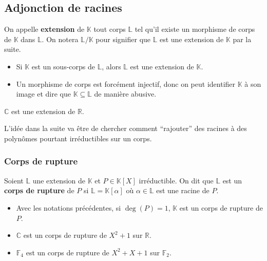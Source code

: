   \subsection{Adjonction de racines}
  \label{144-1}


  \begin{definition}
    On appelle \textbf{extension} de $\mathbb{K}$ tout corps $\mathbb{L}$ tel qu'il existe un morphisme de corps de $\mathbb{K}$ dans $\mathbb{L}$. On notera $\mathbb{L} / \mathbb{K}$ pour signifier que $\mathbb{L}$ est une extension de $\mathbb{K}$ par la suite.
  \end{definition}

  \begin{remark}
    \begin{itemize}
      \item Si $\mathbb{K}$ est un sous-corps de $\mathbb{L}$, alors $\mathbb{L}$ est une extension de $\mathbb{K}$.
      \item Un morphisme de corps est forcément injectif, donc on peut identifier $\mathbb{K}$ à son image et dire que $\mathbb{K} \subseteq \mathbb{L}$ de manière abusive.
    \end{itemize}
  \end{remark}

  \begin{example}
    $\mathbb{C}$ est une extension de $\mathbb{R}$.
  \end{example}

  L'idée dans la suite va être de chercher comment ``rajouter'' des racines à des polynômes pourtant irréductibles sur un corps.

  \subsubsection{Corps de rupture}


  \begin{definition}
    Soient $\mathbb{L}$ une extension de $\mathbb{K}$ et $P \in \mathbb{K}[X]$ irréductible. On dit que $\mathbb{L}$ est un \textbf{corps de rupture} de $P$ si $\mathbb{L} = \mathbb{K}[\alpha]$ où $\alpha \in \mathbb{L}$ est une racine de $P$.
  \end{definition}

  \begin{example}
    \begin{itemize}
      \item Avec les notations précédentes, si $\deg(P) = 1$, $\mathbb{K}$ est un corps de rupture de $P$.
      \item $\mathbb{C}$ est un corps de rupture de $X^2+1$ sur $\mathbb{R}$.
      \item $\mathbb{F}_4$ est un corps de rupture de $X^2+X+1$ sur $\mathbb{F}_2$.
    \end{itemize}
  \end{example}

